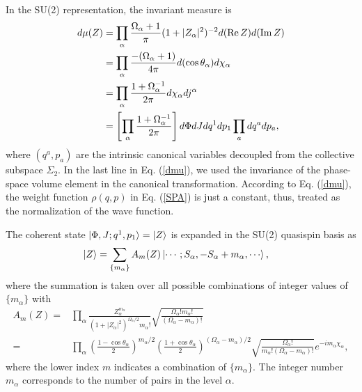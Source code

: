 \documentclass[11pt]{book} %
\begin{document}
In the SU(2) representation, the invariant measure is
\begin{align}
  d\mu(Z) &= \prod_\alpha \frac{\Omega_\alpha+1}{\pi} (1+|Z_\alpha|^2)^{-2} d({\rm Re}\,Z) d({\rm Im}\,Z) \nonumber \\
&= \prod_\alpha \frac{-(\Omega_\alpha+1)}{4\pi} d(\cos{\theta_\alpha}) d\chi_\alpha \nonumber \\
 &= \prod_\alpha \frac{1+\Omega_\alpha^{-1}}{2\pi} d\chi_\alpha dj^\alpha \nonumber \\
 &= \left[ \prod_\alpha \frac{1+\Omega_\alpha^{-1}}{2\pi} \right] d\Phi dJ dq^1 dp_1 %
  \prod_a dq^a dp_a,
	\label{dmu}
\end{align}
where $(q^a,p_a)$ are the intrinsic canonical variables
decoupled from the collective subspace $\Sigma_2$.
In the last line in Eq. (\ref{dmu}),
we used the invariance of the phase-space volume element
in the canonical transformation.
According to Eq. (\ref{dmu}),
the weight function $\rho(q,p)$ in Eq. (\ref{SPA}) is just a constant,
thus, treated as the normalization of the wave function.

The coherent state $\ket{\Phi,J;q^1,p_1}=\ket{Z}$ is
expanded in the SU(2) quasispin basis as
\begin{align}
\ket{Z} &= 
\sum_{\{m_\alpha\}} A_m(Z) \ket{\cdots;S_\alpha,-S_\alpha+m_\alpha,\cdots},
\end{align}
where the summation is taken over all possible combinations
of integer values of $\{ m_\alpha\}$ with
\begin{align}
A_m(Z) =& \prod_\alpha 
\frac{Z_\alpha^{m_\alpha}}
	{\left(1+|Z_\alpha|^2\right)^{\Omega_\alpha/2}m_\alpha!}
\sqrt{\frac{\Omega_\alpha! m_\alpha!}{(\Omega_\alpha-m_\alpha)!}} \nonumber\\
 =& \prod_\alpha \left(\frac{1-\cos{\theta}_\alpha}{2}\right)^{m_\alpha/2}\left(\frac{1+\cos{\theta}_\alpha}{2}\right)^{(\Omega_\alpha-m_\alpha)/2}
\sqrt{\frac{\Omega_\alpha!}{m_\alpha!(\Omega_\alpha-m_\alpha)!}} e^{-i m_\alpha\chi_\alpha}  ,
	\label{A_m}
\end{align}
where the lower index $m$ indicates a combination of $\{ m_\alpha \}$.
The integer number $m_\alpha$ corresponds to the number of pairs
in the level $\alpha$.
%
\end{document}
